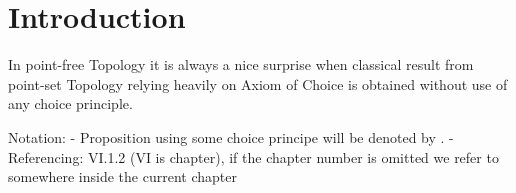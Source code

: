 \chapter{Introduction}
\cite{picado2011frames}

In point-free Topology it is always a nice surprise when classical result from point-set Topology relying heavily on Axiom of Choice is obtained without use of any choice principle.


Notation:
- Proposition using some choice principe will be denoted by \ACPStar.
- Referencing: VI.1.2 (VI is chapter), if the chapter number is omitted we refer to somewhere inside the current chapter
